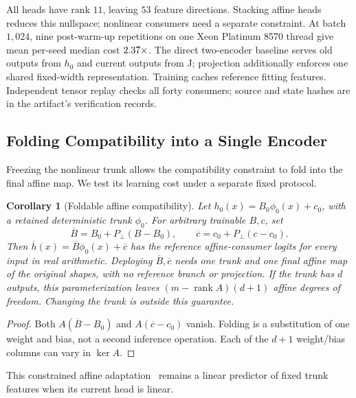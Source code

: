 \documentclass{article}
\newtheorem{corollary}{Corollary}
\begin{document}
All heads have rank $11$, leaving $53$ feature directions. Stacking affine
heads reduces this nullspace; nonlinear consumers need a separate constraint.
At batch $1{,}024$, nine post-warm-up repetitions on one Xeon Platinum 8570
thread give mean per-seed median cost $2.37\times$.
The direct two-encoder baseline serves old outputs from $h_0$ and current
outputs from J; projection additionally enforces one shared fixed-width
representation. Training caches reference fitting features. Independent
tensor replay checks all forty consumers; source and state hashes are in
the artifact's verification records.

\subsection{Folding Compatibility into a Single Encoder}\label{app:compiled_interface}

Freezing the nonlinear trunk allows the compatibility constraint to fold into
the final affine map. We test its learning cost under a separate fixed protocol.

\begin{corollary}[Foldable affine compatibility]\label{cor:compiled_interface}
Let $h_0(x)=B_0\phi_0(x)+c_0$, with a retained deterministic trunk $\phi_0$. For arbitrary trainable $B,c$, set
\begin{equation}
 \overline B=B_0+P_\perp(B-B_0),\qquad
 \overline c=c_0+P_\perp(c-c_0).
 \label{eq:compiled_affine}
\end{equation}
Then $\overline h(x)=\overline B\phi_0(x)+\overline c$ has the reference affine-consumer logits for every input in real arithmetic. Deploying $\overline B,\overline c$ needs one trunk and one final affine map of the original shapes, with no reference branch or projection. If the trunk has $d$ outputs, this parameterization leaves $(m-\operatorname{rank}A)(d+1)$ affine degrees of freedom. Changing the trunk is outside this guarantee.
\end{corollary}
\begin{proof}
Both $A(\overline B-B_0)$ and $A(\overline c-c_0)$ vanish. Folding is a substitution of one weight and bias, not a second inference operation. Each of the $d+1$ weight/bias columns can vary in $\ker A$.
\end{proof}

This constrained affine adaptation~\citep{farajtabar2020ogd,pham2026ness,hu2022lora}
remains a linear predictor of fixed trunk features when its current head is linear.
\end{document}
